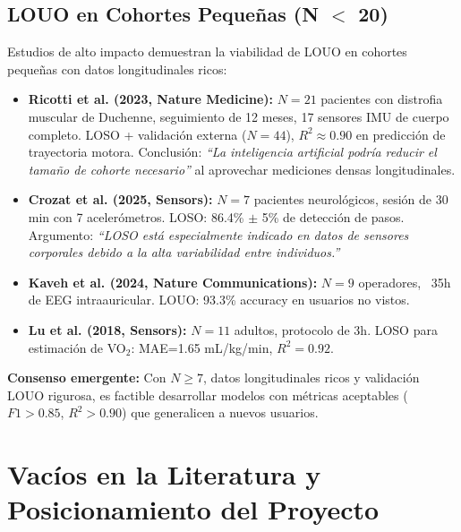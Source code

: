 \subsection{LOUO en Cohortes Pequeñas (N $<$ 20)}
\label{subsec:louo_cohortes_pequenas}

Estudios de alto impacto demuestran la viabilidad de LOUO en cohortes pequeñas con datos longitudinales ricos:

\begin{itemize}
    \item \textbf{Ricotti et al. (2023, Nature Medicine):} $N=21$ pacientes con distrofia muscular de Duchenne, seguimiento de 12 meses, 17 sensores IMU de cuerpo completo. LOSO + validación externa ($N=44$), $R^2 \approx 0.90$ en predicción de trayectoria motora. Conclusión: \textit{``La inteligencia artificial podría reducir el tamaño de cohorte necesario''} al aprovechar mediciones densas longitudinales.
    
    \item \textbf{Crozat et al. (2025, Sensors):} $N=7$ pacientes neurológicos, sesión de 30 min con 7 acelerómetros. LOSO: 86.4\% $\pm$ 5\% de detección de pasos. Argumento: \textit{``LOSO está especialmente indicado en datos de sensores corporales debido a la alta variabilidad entre individuos.''}
    
    \item \textbf{Kaveh et al. (2024, Nature Communications):} $N=9$ operadores, ~35h de EEG intraauricular. LOUO: 93.3\% accuracy en usuarios no vistos.
    
    \item \textbf{Lu et al. (2018, Sensors):} $N=11$ adultos, protocolo de 3h. LOSO para estimación de VO$_2$: MAE=1.65 mL/kg/min, $R^2=0.92$.
\end{itemize}

\textbf{Consenso emergente:} Con $N \geq 7$, datos longitudinales ricos y validación LOUO rigurosa, es factible desarrollar modelos con métricas aceptables ($F1 > 0.85$, $R^2 > 0.90$) que generalicen a nuevos usuarios.

\section{Vacíos en la Literatura y Posicionamiento del Proyecto}
\label{sec:vacios_literatura}


